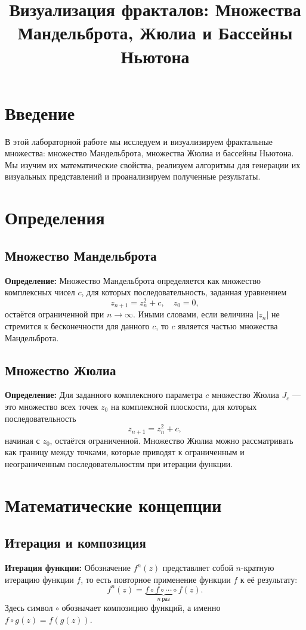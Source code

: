 \documentclass{article}
\title{Визуализация фракталов: Множества Мандельброта, Жюлиа и Бассейны Ньютона}
\author{}
\date{}
\begin{document}
	
	
	
	\tableofcontents
	\newpage
	
	\section{Введение}
	В этой лабораторной работе мы исследуем и визуализируем фрактальные множества: множество Мандельброта, множества Жюлиа и бассейны Ньютона. Мы изучим их математические свойства, реализуем алгоритмы для генерации их визуальных представлений и проанализируем полученные результаты.
	
	\section{Определения}
	
	\subsection{Множество Мандельброта}
	\textbf{Определение:} Множество Мандельброта определяется как множество комплексных чисел $c$, для которых последовательность, заданная уравнением
	\begin{equation}
		z_{n+1} = z_n^2 + c, \quad z_0 = 0,
	\end{equation}
	остаётся ограниченной при $n \to \infty$. Иными словами, если величина $|z_n|$ не стремится к бесконечности для данного $c$, то $c$ является частью множества Мандельброта.
	
	\subsection{Множество Жюлиа}
	\textbf{Определение:} Для заданного комплексного параметра $c$ множество Жюлиа $J_c$ — это множество всех точек $z_0$ на комплексной плоскости, для которых последовательность
	\begin{equation}
		z_{n+1} = z_n^2 + c,
	\end{equation}
	начиная с $z_0$, остаётся ограниченной. Множество Жюлиа можно рассматривать как границу между точками, которые приводят к ограниченным и неограниченным последовательностям при итерации функции.
	
	\section{Математические концепции}
	
	\subsection{Итерация и композиция}
	\textbf{Итерация функции:} Обозначение $f^n(z)$ представляет собой $n$-кратную итерацию функции $f$, то есть повторное применение функции $f$ к её результату:
	\begin{equation}
		f^n(z) = \underbrace{f \circ f \circ \cdots \circ f}_{n\ \text{раз}}(z).
	\end{equation}
	Здесь символ $\circ$ обозначает композицию функций, а именно $f \circ g(z) = f(g(z))$.
	
\end{document}
